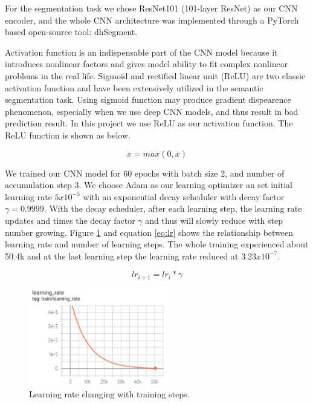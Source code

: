 \documentclass[12pt]{article}
\begin{document}
For the segmentation task we chose ResNet101 (101-layer ResNet) as our CNN encoder, and the whole CNN architecture was implemented through a PyTorch\cite{NEURIPS2019_9015} based open-source tool: dhSegment\cite{oliveiraseguinkaplan2018dhsegment}.

Activation function is an indispensable part of the CNN model because it introduces  nonlinear factors and gives model ability to fit complex nonlinear problems in the real life. Sigmoid and rectified linear unit (ReLU) are two classic activation function and have been extensively utilized in the semantic segmentation task. Using sigmoid function may produce gradient dispearence phenomenon, especially when we use deep CNN models, and thus result in bad prediction result. In this project we use ReLU as our activation function. The ReLU function is shown as below.

\begin{equation}
    x = max(0, x)
\end{equation}


We trained our CNN model for 60 epochs with batch size 2, and number of accumulation step 3.  We choose Adam as our learning optimizer an set initial learning rate $5x10^{-5}$ with an exponential decay scheduler with decay factor $\gamma=0.9999$. With the decay scheduler, after each learning step, the learning rate updates and times the decay factor $\gamma$ and thus will slowly reduce with step number growing. Figure \ref{fig:learning_rate} and equation \ref{eq:lr} shows the relationship between learning rate and number of learning steps. The whole training experienced about 50.4k and at the last learning step the learning rate reduced at $3.23x10^{-7}$.



\begin{equation}
    lr_{i+1}=lr_{i} * \gamma
    \label{eq:lr}
\end{equation}

\begin{figure}[H]
    \centering
    \includegraphics[height=120pt]{images/lr.png}
    \caption{Learning rate changing with training steps.}
    \label{fig:learning_rate}
\end{figure}
\end{document}
